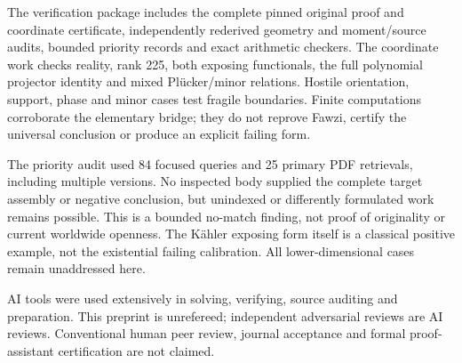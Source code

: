 \documentclass[11pt]{article}
\begin{document}
The verification package includes the complete pinned original proof and
coordinate certificate, independently rederived geometry and moment/source
audits, bounded priority records and exact arithmetic checkers. The
coordinate work checks reality, rank 225, both exposing functionals, the
full polynomial projector identity and mixed Pl\"ucker/minor relations.
Hostile orientation, support, phase and minor cases test fragile boundaries.
Finite computations corroborate the elementary bridge; they do not reprove
Fawzi, certify the universal conclusion or produce an explicit failing form.

The priority audit used 84 focused queries and 25 primary PDF retrievals,
including multiple versions. No inspected body supplied the complete
target assembly or negative conclusion, but unindexed or differently
formulated work remains possible. This is a bounded no-match finding,
not proof of originality or current worldwide openness. The K\"ahler
exposing form itself is a classical positive example, not the existential
failing calibration. All lower-dimensional cases remain unaddressed here.

AI tools were used extensively in solving, verifying, source auditing and
preparation. This preprint is unrefereed; independent adversarial reviews
are AI reviews. Conventional human peer review, journal acceptance and
formal proof-assistant certification are not claimed.
\end{document}
